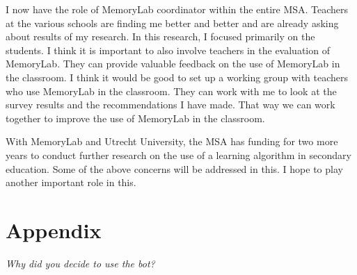 \documentclass[12pt, a4paper]{article}
\begin{document}
{{I now have the role of MemoryLab coordinator within the entire MSA. Teachers at the various schools are finding me better and better and are already asking about results of my research. In this research, I focused primarily on the students. I think it is important to also involve teachers in the evaluation of MemoryLab. They can provide valuable feedback on the use of MemoryLab in the classroom. I think it would be good to set up a working group with teachers who use MemoryLab in the classroom. They can work with me to look at the survey results and the recommendations I have made. That way we can work together to improve the use of MemoryLab in the classroom.

With MemoryLab and Utrecht University, the MSA has funding for two more years to conduct further research on the use of a learning algorithm in secondary education. Some of the above concerns will be addressed in this. I hope to play another important role in this.
\newpage
\appendix
\section{Appendix}
\emph{Why did you decide to use the bot?}

}}
\end{document}

